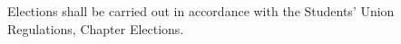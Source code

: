  Elections shall be carried out in accordance with the Students' Union Regulations, Chapter Elections.\ \\